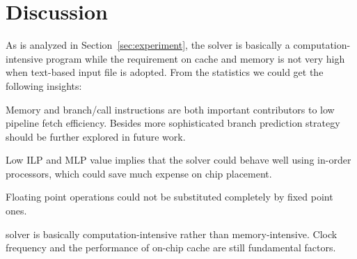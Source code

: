 \section{Discussion}
\label{sec:discussion} 
As is analyzed in Section~\ref{sec:experiment}, the \SA solver is basically a computation-intensive program while the requirement on cache and memory is not very high when text-based input file is adopted. From the statistics we could get the following insights:
\begin{compactitem}
\item Memory and branch/call instructions are both important contributors to low pipeline fetch efficiency. Besides more sophisticated branch prediction strategy should be further explored in future work.
\item Low ILP and MLP value implies that the \SA solver could behave well using in-order processors, which could save much expense on chip placement.
\item Floating point operations could not be substituted completely by fixed point ones.
\item \SA solver is basically computation-intensive rather than memory-intensive. Clock frequency and the performance of on-chip cache are still fundamental factors.
\end{compactitem}  